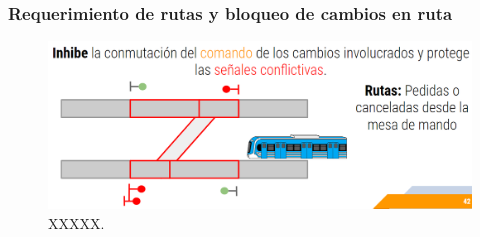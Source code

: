 \subsubsection{Requerimiento de rutas y bloqueo de cambios en ruta}

\lipsum[1]
    \begin{figure}[!h]
        \centering
        \includegraphics[width=1\textwidth]{Figuras/bloqueo_rutas}
        \centering\caption{XXXXX.}
        \label{fig:ocupacion_1}
    \end{figure}
\lipsum[1]